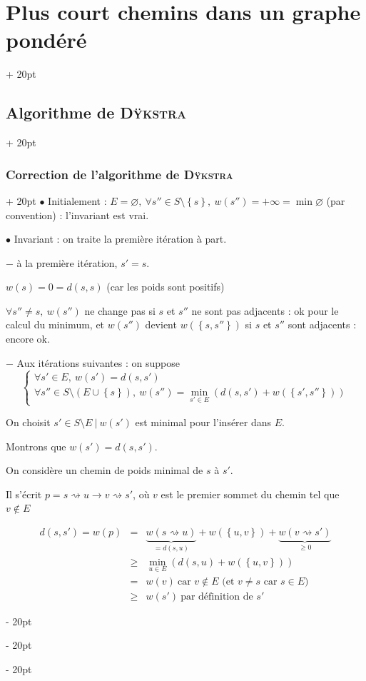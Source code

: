 \documentclass[a4paper, 12pt, twoside]{article}
\newcommand{\set}[1]{\left\{ #1 \right\}}
\renewcommand{\ge}{\geqslant}
\newcommand{\ind}[1][20pt]{\advance\leftskip + #1}
\newcommand{\deind}[1][20pt]{\advance\leftskip - #1}
\newenvironment{indt}[2][20pt]{#2 \par \ind[#1]}{\par \deind} %
\begin{document}
\begin{indt}{\section{Plus court chemins dans un graphe pondéré}}
\begin{indt}{\subsection{Algorithme de \textsc{Dÿkstra}}}
\begin{indt}{\subsubsection{Correction de l'algorithme de \textsc{Dÿkstra}}}
                $\bullet$ Initialement : $E = \varnothing,\ \forall s'' \in S \setminus \set s,\ w(s'') = +\infty = \min \varnothing$ (par convention) : l'invariant est vrai.

                \vspace{6pt}
                
                $\bullet$ Invariant : on traite la première itération à part.

                $-$ à la première itération, $s' = s$.

                $w(s) = 0 = d(s, s)$ (car les poids sont positifs)

                $\forall s'' \neq s,\ w(s'')$ ne change pas si $s$ et $s''$ ne sont pas adjacents : ok pour le calcul du minimum,
                et $w(s'')$ devient $w(\set{s, s''})$ si $s$ et $s''$ sont adjacents : encore ok.

                \vspace{6pt}
                
                $-$ Aux itérations suivantes : on suppose
                \[
                    \begin{cases}
                        \forall s' \in E,\ w(s') = d(s, s')
                        \\
                        \forall s'' \in S \setminus (E \cup \set s),\ w(s'') = \displaystyle \min_{s' \in E}(d(s, s') + w(\set{s', s''}))
                    \end{cases}
                \]

                On choisit $s' \in S \setminus E\ |\ w(s')$ est minimal pour l'insérer dans $E$.

                Montrons que $w(s') = d(s, s')$.

                On considère un chemin de poids minimal de $s$ à $s'$.

                Il s'écrit $p = s \rightsquigarrow u \rightarrow v \rightsquigarrow s'$, où $v$ est le premier sommet du chemin tel que $v \notin E$

                \[
                    \begin{array}{rcl}
                        d(s, s') =
                        w(p) &=&
                        \underbrace{w(s \rightsquigarrow u)}_{= d(s, u)}
                        + w(\set{u, v})
                        + \underbrace{w(v \rightsquigarrow s')}_{\ge 0}
                        \\
                        &\ge&
                        \displaystyle \min_{u \in E}(d(s, u) + w(\set{u, v}))
                        \\
                        &=& w(v)\ \text{car $v \notin E$ (et $v \neq s$ car $s \in E$)}
                        \\
                        &\ge& w(s')\ \text{par définition de $s'$}
                    \end{array}
                \]


\end{indt}
\end{indt}
\end{indt}
\end{document}
